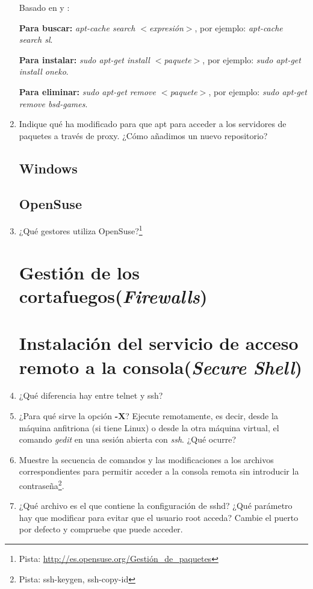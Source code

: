 \documentclass[paper=a4, fontsize=11pt]{scrartcl} %
\numberwithin{equation}{section} %
\numberwithin{figure}{section} %
\numberwithin{table}{section} %
\begin{document}
\begin{enumerate}
	Basado en \cite{man_apt-cache} y \cite{man_apt-get}:
	
	\textbf{Para buscar:} \textit{apt-cache search $<$expresión$>$}, por ejemplo: \textit{apt-cache
	search sl}.
	
	\textbf{Para instalar:} \textit{sudo apt-get install $<$paquete$>$}, por ejemplo: \textit{sudo apt-get
	install oneko}.
	
	\textbf{Para eliminar:} \textit{sudo apt-get remove $<$paquete$>$}, por ejemplo: \textit{sudo apt-get
	remove bsd-games}.
	
	\item Indique qué ha modificado para que apt para acceder a los servidores de paquetes a través de
	proxy. ¿Cómo añadimos un nuevo repositorio?
	
	\subsection{Windows}
	\subsection{OpenSuse}
	\item ¿Qué gestores utiliza OpenSuse?\footnote{Pista: \url{http://es.opensuse.org/Gestión_de_paquetes}}
	
	\section{Gestión de los cortafuegos(\textit{Firewalls})}
	\section{Instalación del servicio de acceso remoto a la consola(\textit{Secure Shell})}
	\item ¿Qué diferencia hay entre telnet y ssh?
	
	\item ¿Para qué sirve la opción \textbf{-X}? Ejecute remotamente, es decir, desde la máquina
	anfitriona (si tiene Linux) o desde la otra máquina virtual, el comando \textit{gedit} en una sesión
	abierta con \textit{ssh}. ¿Qué ocurre?
	
	\item Muestre la secuencia de comandos y las modificaciones a los archivos correspondientes para
	permitir acceder a la consola remota sin introducir la contraseña\footnote{Pista: ssh-keygen, ssh-copy-id}.

	\item ¿Qué archivo es el que contiene la configuración de sshd? ¿Qué parámetro hay que modificar
	para evitar que el usuario root acceda? Cambie el puerto por defecto y compruebe que puede acceder.


\end{enumerate}
\end{document}
